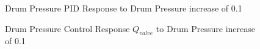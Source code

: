     \begin{figure}[ht]
        \begin{center}
            \caption{Drum Pressure PID Response to Drum Pressure increase of 0.1}
            \label{fig:PID_Pressure_PressStep}
        \end{center}
    \end{figure}  %
    \begin{figure}[ht]
        \begin{center}
            \caption{Drum Pressure Control Response $Q_{valve}$ to Drum Pressure increase of 0.1}
            \label{fig:PID_Pressure_PressStep_Control}
        \end{center}
    \end{figure}  %
    
